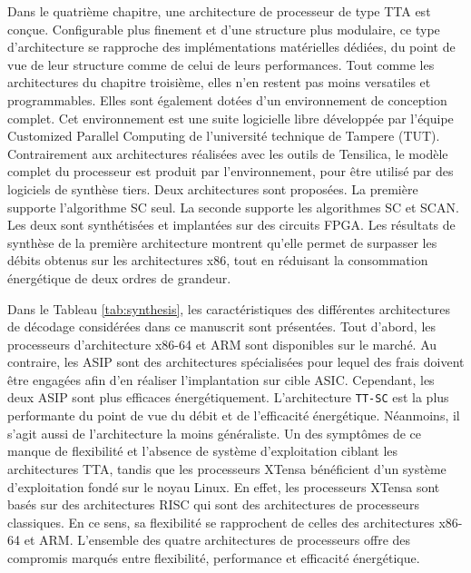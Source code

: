 Dans le quatrième chapitre, une architecture de processeur de type TTA est conçue. Configurable plus finement et d'une structure plus modulaire, ce type d'architecture se rapproche des implémentations matérielles dédiées, du point de vue de leur structure comme de celui de leurs performances. Tout comme les architectures du chapitre troisième, elles n'en restent pas moins versatiles et programmables. Elles sont également dotées d'un environnement de conception complet. Cet environnement est une suite logicielle libre développée par l'équipe \og Customized Parallel Computing \fg de l'université technique de Tampere (TUT). Contrairement aux architectures réalisées avec les outils de Tensilica, le modèle complet du processeur est produit par l'environnement, pour être utilisé par des logiciels de synthèse tiers. Deux architectures sont proposées. La première supporte l'algorithme SC seul. La seconde supporte les algorithmes SC et SCAN. Les deux sont synthétisées et implantées sur des circuits FPGA. Les résultats de synthèse de la première architecture montrent qu'elle permet de surpasser les débits obtenus sur les architectures x86, tout en réduisant la consommation énergétique de deux ordres de grandeur.

Dans le Tableau \ref{tab:synthesis}, les caractéristiques des différentes architectures de décodage considérées dans ce manuscrit sont présentées. Tout d'abord, les processeurs d'architecture x86-64 et ARM sont disponibles sur le marché. Au contraire, les ASIP sont des architectures spécialisées pour lequel des frais doivent être engagées afin d'en réaliser l'implantation sur cible ASIC. Cependant, les deux ASIP sont plus efficaces énergétiquement. L'architecture \texttt{TT-SC} est la plus performante du point de vue du débit et de l'efficacité énergétique. Néanmoins, il s'agit aussi de l'architecture la moins généraliste. Un des symptômes de ce manque de flexibilité et l'absence de système d'exploitation ciblant les architectures TTA, tandis que les processeurs XTensa bénéficient d'un système d'exploitation fondé sur le noyau Linux. En effet, les processeurs XTensa sont basés sur des architectures RISC qui sont des architectures de processeurs classiques. En ce sens, sa flexibilité se rapprochent de celles des architectures x86-64 et ARM.
L'ensemble des quatre architectures de processeurs offre des compromis marqués entre flexibilité, performance et efficacité énergétique.

